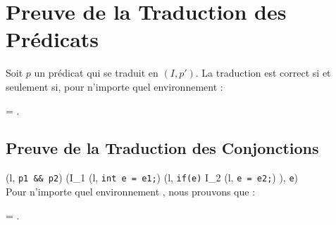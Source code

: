 \section{Preuve de la Traduction des Prédicats}
\label{sec:predicate-translation}


\begin{lemma}\label{lem:pred-correct}
  Soit $p$ un prédicat qui se traduit en $(I, p')$.
  La traduction est correct si et seulement si, pour n'importe quel
  environnement \env :

   = .
\end{lemma}


\subsection{Preuve de la Traduction des Conjonctions}

{
  { (l, \mbox{\lstinline'p1 && p2'}) 
    (I_1 \cdot (l, \mbox{\lstinline'int e = e1;'}) \cdot
    (l, \mbox{\lstinline'if(e)'} \bopen I_2 \cdot
    (l, \mbox{\lstinline'e = e2;'}) \bclose ),
    \mbox{\lstinline'e'})
  }
}~\\

Pour n'importe quel environnement \env, nous prouvons que :

 = .


